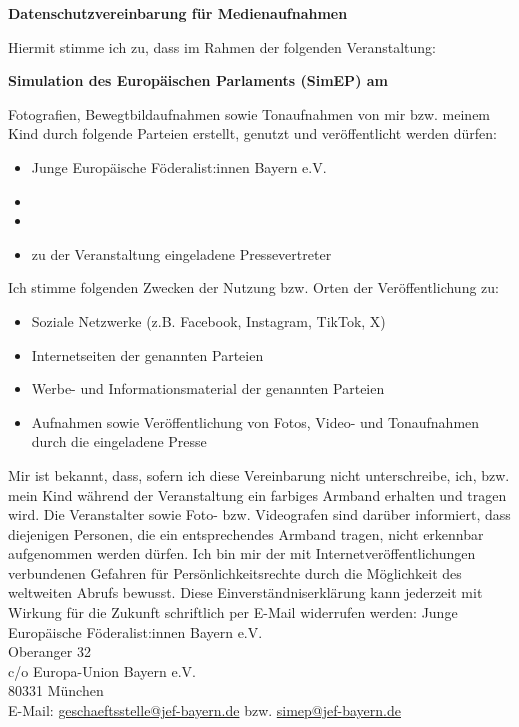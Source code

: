 \documentclass[10pt]{article}
\begin{document}
\thispagestyle{empty}

\begin{center}
    \textbf{\Large Datenschutzvereinbarung für Medienaufnahmen}
\end{center}

\vspace{0.5cm}

Hiermit stimme ich zu, dass im Rahmen der folgenden Veranstaltung:

\begin{center}
    \textbf{Simulation des Europäischen Parlaments (SimEP) am \datum\ \location}
\end{center}

Fotografien, Bewegtbildaufnahmen sowie Tonaufnahmen von mir bzw. meinem Kind durch folgende Parteien erstellt, genutzt und veröffentlicht werden dürfen:

\begin{itemize}[leftmargin=1.5cm]
    \item Junge Europäische Föderalist:innen Bayern e.V.
    \item \sponsor
    \item \localSupport
    \item zu der Veranstaltung eingeladene Pressevertreter
\end{itemize}

Ich stimme folgenden Zwecken der Nutzung bzw. Orten der Veröffentlichung zu:

\begin{itemize}[leftmargin=1.5cm]
    \item Soziale Netzwerke (z.B. Facebook, Instagram, TikTok, X)
    \item Internetseiten der genannten Parteien
    \item Werbe- und Informationsmaterial der genannten Parteien
    \item Aufnahmen sowie Veröffentlichung von Fotos, Video- und Tonaufnahmen durch die eingeladene Presse
\end{itemize}

Mir ist bekannt, dass, sofern ich diese Vereinbarung nicht unterschreibe, ich, bzw. mein Kind während der Veranstaltung ein farbiges Armband erhalten und tragen wird. Die Veranstalter sowie Foto- bzw. Videografen sind darüber informiert, dass diejenigen Personen, die ein entsprechendes Armband tragen, nicht erkennbar aufgenommen werden dürfen. \newline
Ich bin mir der mit Internetveröffentlichungen verbundenen Gefahren für Persönlichkeitsrechte durch die Möglichkeit des weltweiten Abrufs bewusst. \newline
Diese Einverständniserklärung kann jederzeit mit Wirkung für die Zukunft schriftlich per E-Mail widerrufen werden:\newline
\newline
Junge Europäische Föderalist:innen Bayern e.V.\\
Oberanger 32\\
c/o Europa-Union Bayern e.V.\\
80331 München\\
E-Mail: \href{mailto:geschaeftsstelle@jef-bayern.de}{geschaeftsstelle@jef-bayern.de} bzw. \href{mailto:simep@jef-bayern.de}{simep@jef-bayern.de}
\end{document}
